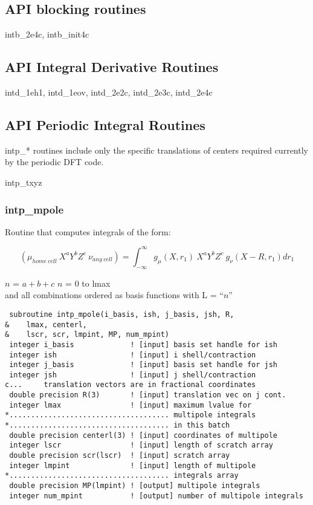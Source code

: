 \subsection{API blocking routines}
intb\_2e4c, intb\_init4c

\subsection{API Integral Derivative Routines}
intd\_1eh1, intd\_1eov, intd\_2e2c, intd\_2e3c, intd\_2e4c 

\subsection{API Periodic Integral Routines}
intp\_* routines include only the specific translations of centers
required currently by the periodic DFT code.

intp\_txyz 

\subsubsection{intp\_mpole}
Routine that computes integrals of the form:

\[
({\mu}_{home~cell}{~}X^{a}Y^{b}Z^{c}{~}{\nu}_{any~cell}) = \int_{-\infty}^{\infty} g_{\mu}(X,r_{1}){~}X^{a}Y^{b}Z^{c}{~}g_{\nu}(X-R,r_{1})dr_{1}
\]

\begin{center}
$n$ = $a + b + c$ \hspace{10mm} $n$ = 0 to lmax \\ and all
combinations ordered as basis functions with L = ``$n$''
\end{center}

\begin{verbatim}
 subroutine intp_mpole(i_basis, ish, j_basis, jsh, R,
&    lmax, centerl,
&    lscr, scr, lmpint, MP, num_mpint)
 integer i_basis             ! [input] basis set handle for ish
 integer ish                 ! [input] i shell/contraction
 integer j_basis             ! [input] basis set handle for jsh
 integer jsh                 ! [input] j shell/contraction
c...     translation vectors are in fractional coordinates 
 double precision R(3)       ! [input] translation vec on j cont.
 integer lmax                ! [input] maximum lvalue for 
*..................................... multipole integrals 
*..................................... in this batch
 double precision centerl(3) ! [input] coordinates of multipole
 integer lscr                ! [input] length of scratch array
 double precision scr(lscr)  ! [input] scratch array
 integer lmpint              ! [input] length of multipole 
*..................................... integrals array
 double precision MP(lmpint) ! [output] multipole integrals
 integer num_mpint           ! [output] number of multipole integrals
\end{verbatim}

